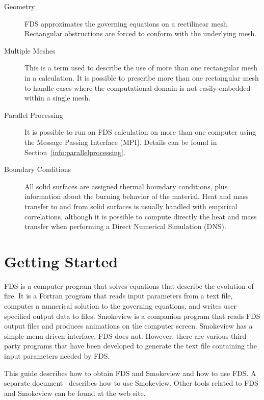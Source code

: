 \documentclass[11pt]{book}
\begin{document}
\begin{description}
\item[Geometry]
FDS approximates the governing equations on a rectilinear mesh.
Rectangular obstructions are forced to conform with the underlying mesh.

\item[Multiple Meshes] This is a term used to describe the use of
more than one rectangular mesh in a calculation. It is possible to prescribe
more than one rectangular mesh to handle cases where the computational
domain is not easily embedded within a single mesh.

\item[Parallel Processing] It is possible to run an FDS calculation on
more than one computer using the Message Passing Interface (MPI). Details
can be found in Section~\ref{info:parallelprocessing}.

\item[Boundary Conditions]
All solid surfaces are assigned thermal boundary conditions, plus
information about the burning behavior of the material.
Heat and mass transfer to and from solid surfaces is
usually handled with empirical correlations, although it is possible
to compute directly the heat and mass transfer when performing a
Direct Numerical Simulation (DNS).

\end{description}





\chapter{Getting Started}
\label{info:gettingstarted}

FDS is a computer program that solves equations that describe the evolution of fire.
It is a Fortran program that reads input parameters from a text file, computes
a numerical solution to the governing equations, and writes user-specified output data to files.
Smokeview is a companion program that reads FDS output files and produces animations on the computer screen.
Smokeview has a simple menu-driven interface. FDS does not. However, there are various third-party programs
that have been developed to generate the text file containing the input parameters needed by FDS.

This guide describes how to obtain FDS and Smokeview and how to use FDS.
A separate document~\cite{Smokeview_Users_Guide} describes how to use Smokeview. Other tools related to
FDS and Smokeview can be found at the web site.
\end{document}
